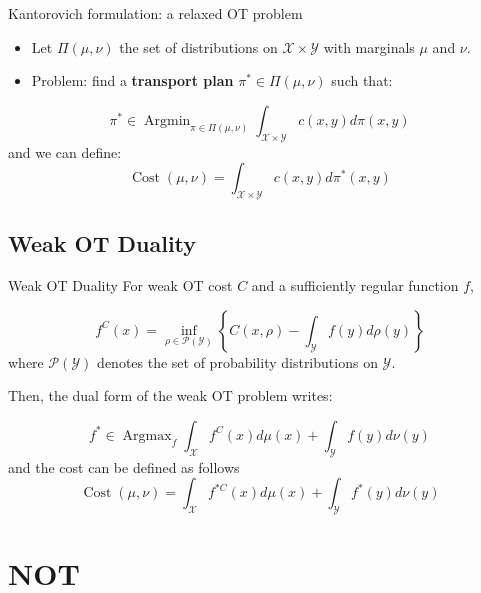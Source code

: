 \documentclass{beamer}
\DeclareMathOperator*{\Argmin}{\text{Argmin}}
\DeclareMathOperator*{\Argmax}{\text{Argmax}}
\DeclareMathOperator*{\Cost}{\text{Cost}}
\begin{document}
\begin{frame}{Kantorovich formulation: a relaxed OT problem}
    \begin{itemize}
        \item Let $\Pi(\mu,\nu)$ the set of distributions on $\mathcal{X}\times\mathcal{Y}$ with marginals $\mu$ and $\nu$.
        \item Problem: find a \textbf{transport plan} $\pi^*\in \Pi(\mu,\nu)$ such that:
    \end{itemize}
    \begin{equation}
        \pi^* \in \Argmin_{\pi\in\Pi(\mu,\nu)} \int_{\mathcal{X}\times\mathcal{Y}} c(x,y)d\pi(x,y)
    \end{equation}
    and we can define:
    \begin{equation}
        \Cost(\mu,\nu) = \int_{\mathcal{X}\times\mathcal{Y}} c(x,y)d\pi^*(x,y)
    \end{equation}
\end{frame}

\subsection{Weak OT Duality}
\begin{frame}{Weak OT Duality}
    For weak OT cost $C$ and a sufficiently regular function $f$,

    \begin{equation}
        f^C(x) = \inf_{\rho\in \mathcal{P}(\mathcal{Y})} \left\{C(x,\rho)-\int_{\mathcal{Y}}f(y)d\rho(y)\right\}
    \end{equation}
    where $\mathcal{P}(\mathcal{Y})$ denotes the set of probability distributions on $\mathcal{Y}$.

    Then, the dual form of the weak OT problem writes:

    \begin{equation}
        f^*\in\Argmax_{f} \int_{\mathcal{X}} f^C(x)d\mu(x) + \int_{\mathcal{Y}} f(y)d\nu(y)
    \end{equation}
    and the cost can be defined as follows
    \begin{equation}
        \Cost(\mu,\nu) = \int_{\mathcal{X}} f^{*C}(x)d\mu(x) + \int_{\mathcal{Y}} f^*(y)d\nu(y)
    \end{equation}

\end{frame}

\section{NOT}
\end{document}
